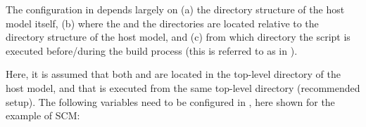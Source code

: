 The configuration in  depends largely on (a) the directory structure of the host model itself, (b) where the  and the  directories are located relative to the directory structure of the host model, and (c) from which directory the  script is executed before/during the build process (this is referred to as  in ).

Here, it is assumed that both  and  are located in the top-level directory of the host model, and that  is executed from the same top-level directory (recommended setup). The following variables need to be configured in , here shown for the example of SCM:
